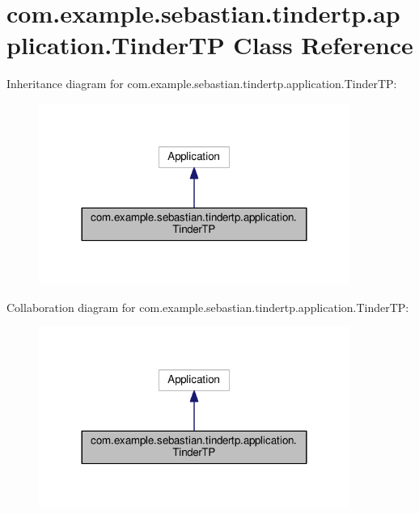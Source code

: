 \hypertarget{classcom_1_1example_1_1sebastian_1_1tindertp_1_1application_1_1TinderTP}{}\section{com.\+example.\+sebastian.\+tindertp.\+application.\+Tinder\+TP Class Reference}
\label{classcom_1_1example_1_1sebastian_1_1tindertp_1_1application_1_1TinderTP}


Inheritance diagram for com.\+example.\+sebastian.\+tindertp.\+application.\+Tinder\+TP\+:\nopagebreak
\begin{figure}[H]
\begin{center}
\leavevmode
\includegraphics[width=288pt]{classcom_1_1example_1_1sebastian_1_1tindertp_1_1application_1_1TinderTP__inherit__graph}
\end{center}
\end{figure}


Collaboration diagram for com.\+example.\+sebastian.\+tindertp.\+application.\+Tinder\+TP\+:\nopagebreak
\begin{figure}[H]
\begin{center}
\leavevmode
\includegraphics[width=288pt]{classcom_1_1example_1_1sebastian_1_1tindertp_1_1application_1_1TinderTP__coll__graph}
\end{center}
\end{figure}
